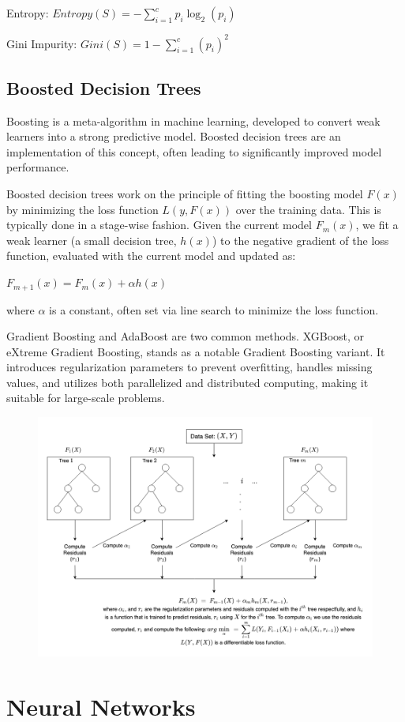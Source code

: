 Entropy: $Entropy(S) = - \sum_{i=1}^{c} p_i \log_2(p_i)$

Gini Impurity: $Gini(S) = 1 - \sum_{i=1}^{c} (p_i)^2$

\subsection{Boosted Decision Trees}
 
Boosting is a meta-algorithm in machine learning, developed to convert weak learners into a strong predictive model. Boosted decision trees are an implementation of this concept, often leading to significantly improved model performance.

Boosted decision trees work on the principle of fitting the boosting model $F(x)$ by minimizing the loss function $L(y, F(x))$ over the training data. This is typically done in a stage-wise fashion. Given the current model $F_m(x)$, we fit a weak learner (a small decision tree, $h(x)$) to the negative gradient of the loss function, evaluated with the current model and updated as:

$F_{m+1}(x) = F_{m}(x) + \alpha h(x)$

where $\alpha$ is a constant, often set via line search to minimize the loss function.

Gradient Boosting and AdaBoost are two common methods. XGBoost, or eXtreme Gradient Boosting, stands as a notable Gradient Boosting variant. It introduces regularization parameters to prevent overfitting, handles missing values, and utilizes both parallelized and distributed computing, making it suitable for large-scale problems.

\begin{figure}[h!]
	\centering
	\includegraphics[width=0.8\linewidth]{Images/XGBoost}
	\caption{}%
	\label{fig:xgboost}
\end{figure}


\section{Neural Networks}